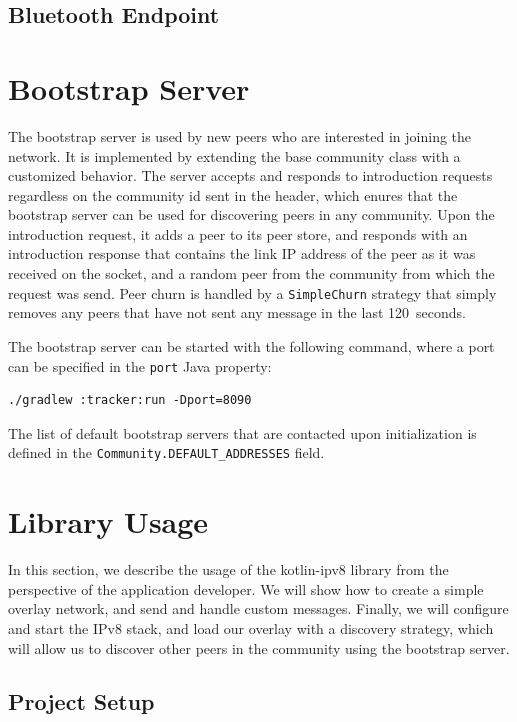 \subsection{Bluetooth Endpoint}

\section{Bootstrap Server}

The bootstrap server is used by new peers who are interested in joining the network. It is implemented by extending the base community class with a customized behavior. The server accepts and responds to introduction requests regardless on the community id sent in the header, which enures that the bootstrap server can be used for discovering peers in any community. Upon the introduction request, it adds a peer to its peer store, and responds with an introduction response that contains the link IP address of the peer as it was received on the socket, and a random peer from the community from which the request was send. Peer churn is handled by a \texttt{SimpleChurn} strategy that simply removes any peers that have not sent any message in the last 120~seconds.

The bootstrap server can be started with the following command, where a port can be specified in the \texttt{port} Java property:

\begin{verbatim}
./gradlew :tracker:run -Dport=8090
\end{verbatim}

The list of default bootstrap servers that are contacted upon initialization is defined in the \texttt{Community.DEFAULT\_ADDRESSES} field.

\section{Library Usage}

In this section, we describe the usage of the kotlin-ipv8 library from the perspective of the application developer. We will show how to create a simple overlay network, and send and handle custom messages. Finally, we will configure and start the IPv8 stack, and load our overlay with a discovery strategy, which will allow us to discover other peers in the community using the bootstrap server.

\subsection{Project Setup}

